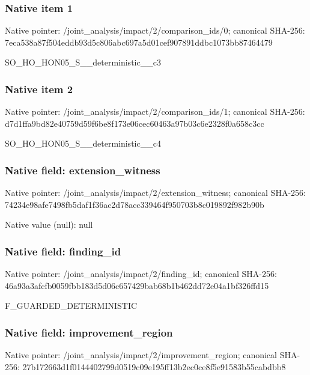 \documentclass[10pt,a4paper]{article}
\begin{document}
\subsubsection{Native item 1}
Native pointer: /joint\_\allowbreak{}analysis/impact/2/comparison\_\allowbreak{}ids/0; canonical SHA-256: 7eca538a87f504eddb93d5c806abc697a5d01cef907891ddbc1073bb87464479

\begingroup\raggedright\sloppy SO\_\allowbreak{}HO\_\allowbreak{}HON05\_\allowbreak{}S\_\allowbreak{}\_\allowbreak{}deterministic\_\allowbreak{}\_\allowbreak{}c3\par\endgroup

\subsubsection{Native item 2}
Native pointer: /joint\_\allowbreak{}analysis/impact/2/comparison\_\allowbreak{}ids/1; canonical SHA-256: d7d1ffa9bd82e40759d59f6be8f173e06cec60463a97b03c6e2328f0a658c3cc

\begingroup\raggedright\sloppy SO\_\allowbreak{}HO\_\allowbreak{}HON05\_\allowbreak{}S\_\allowbreak{}\_\allowbreak{}deterministic\_\allowbreak{}\_\allowbreak{}c4\par\endgroup

\subsubsection{Native field: extension\_\allowbreak{}witness}
Native pointer: /joint\_\allowbreak{}analysis/impact/2/extension\_\allowbreak{}witness; canonical SHA-256: 74234e98afe7498fb5daf1f36ac2d78acc339464f950703b8c019892f982b90b

Native value (null): null

\subsubsection{Native field: finding\_\allowbreak{}id}
Native pointer: /joint\_\allowbreak{}analysis/impact/2/finding\_\allowbreak{}id; canonical SHA-256: 46a93a3afcfb0059fbb183d5d06c657429bab68b1b462dd72e04a1bf326ffd15

\begingroup\raggedright\sloppy F\_\allowbreak{}GUARDED\_\allowbreak{}DETERMINISTIC\par\endgroup

\subsubsection{Native field: improvement\_\allowbreak{}region}
Native pointer: /joint\_\allowbreak{}analysis/impact/2/improvement\_\allowbreak{}region; canonical SHA-256: 27b172663d1f0144402799d0519c09e195ff13b2ec0ce8f5e91583b55cabdbb8
\end{document}
